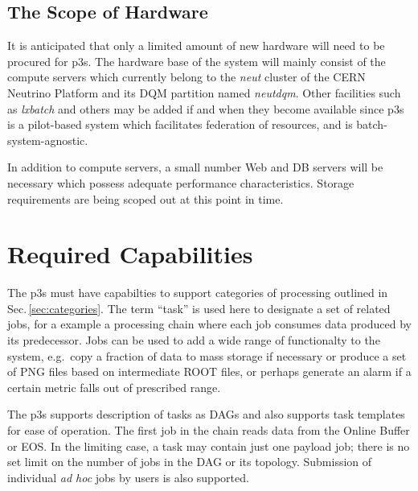 \documentclass[pdftex,12pt,letter]{article}
\begin{document}
\subsection{The Scope of Hardware}
It is anticipated that only a limited amount of new hardware will need to be procured
for p3s. The hardware base of the system will mainly consist of the compute servers
which currently belong to the \textit{neut} cluster of the CERN Neutrino Platform
\cite{neut}
and its DQM partition named \textit{neutdqm}. Other facilities such as \textit{lxbatch}
\cite{lxbatch}
and others may be added if and when they become available since p3s is a pilot-based
system which facilitates federation of resources, and is batch-system-agnostic.

In addition to compute servers, a small number Web and DB servers will be necessary
which possess adequate performance characteristics. Storage requirements are being
scoped out at this point in time.



\section{Required Capabilities}
\label{sec:capabilities}

The p3s must have capabilties to support categories of processing outlined
in Sec.\,\ref{sec:categories}. The term ``task'' is used here to designate a set
of related jobs, for a example a processing chain where each job consumes
data produced by its predecessor. Jobs can be used to add a wide range
of functionalty to the system, e.g.~copy a fraction of data to mass storage
if necessary or produce a set of PNG files based on intermediate ROOT files,
or perhaps generate an alarm if a certain metric falls out of prescribed range.

The p3s supports description of tasks as DAGs and also supports task templates
for ease of operation. The first job in the chain reads data from
the Online Buffer or EOS. In the limiting case, a task may contain just one payload
job; there is no set limit on the number of jobs in the DAG or its topology.
Submission of individual \textit{ad hoc} jobs by users is also supported.
\end{document}
